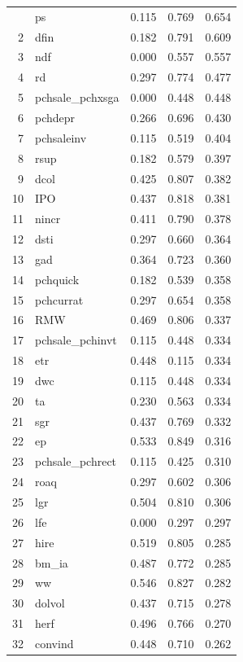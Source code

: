 \begin{footnotesize}
\begin{longtable}{rl|c|c|c}
		\hline\hline
		\endfoot
		1 & ps & 0.115 & 0.769 & 0.654 \\ 
		2 & dfin & 0.182 & 0.791 & 0.609 \\ 
		3 & ndf & 0.000 & 0.557 & 0.557 \\ 
		4 & rd & 0.297 & 0.774 & 0.477 \\ 
		5 & pchsale\_pchxsga & 0.000 & 0.448 & 0.448 \\ 
		6 & pchdepr & 0.266 & 0.696 & 0.430 \\ 
		7 & pchsaleinv & 0.115 & 0.519 & 0.404 \\ 
		8 & rsup & 0.182 & 0.579 & 0.397 \\ 
		9 & dcol & 0.425 & 0.807 & 0.382 \\ 
		10 & IPO & 0.437 & 0.818 & 0.381 \\ 
		11 & nincr & 0.411 & 0.790 & 0.378 \\ 
		12 & dsti & 0.297 & 0.660 & 0.364 \\ 
		13 & gad & 0.364 & 0.723 & 0.360 \\ 
		14 & pchquick & 0.182 & 0.539 & 0.358 \\ 
		15 & pchcurrat & 0.297 & 0.654 & 0.358 \\ 
		16 & RMW & 0.469 & 0.806 & 0.337 \\ 
		17 & pchsale\_pchinvt & 0.115 & 0.448 & 0.334 \\ 
		18 & etr & 0.448 & 0.115 & 0.334 \\ 
		19 & dwc & 0.115 & 0.448 & 0.334 \\ 
		20 & ta & 0.230 & 0.563 & 0.334 \\ 
		21 & sgr & 0.437 & 0.769 & 0.332 \\ 
		22 & ep & 0.533 & 0.849 & 0.316 \\ 
		23 & pchsale\_pchrect & 0.115 & 0.425 & 0.310 \\ 
		24 & roaq & 0.297 & 0.602 & 0.306 \\ 
		25 & lgr & 0.504 & 0.810 & 0.306 \\ 
		26 & lfe & 0.000 & 0.297 & 0.297 \\ 
		27 & hire & 0.519 & 0.805 & 0.285 \\ 
		28 & bm\_ia & 0.487 & 0.772 & 0.285 \\ 
		29 & ww & 0.546 & 0.827 & 0.282 \\ 
		30 & dolvol & 0.437 & 0.715 & 0.278 \\ 
		31 & herf & 0.496 & 0.766 & 0.270 \\ 
		32 & convind & 0.448 & 0.710 & 0.262 \\ 

\end{longtable}
\end{footnotesize}
